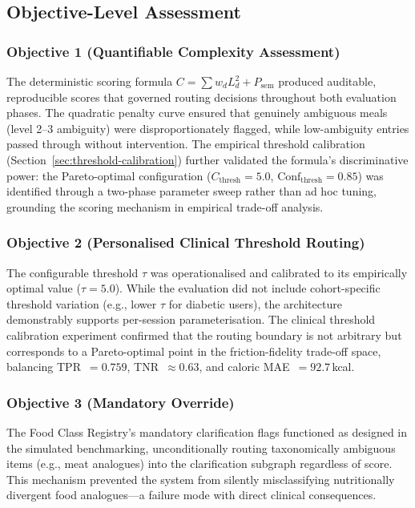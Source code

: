 \subsection{Objective-Level Assessment}

\subsubsection{Objective 1 (Quantifiable Complexity Assessment)}
The deterministic scoring formula $C = \sum w_d L_d^2 + P_{\text{sem}}$ produced auditable, reproducible scores that governed routing decisions throughout both evaluation phases. The quadratic penalty curve ensured that genuinely ambiguous meals (level 2--3 ambiguity) were disproportionately flagged, while low-ambiguity entries passed through without intervention. The empirical threshold calibration (Section~\ref{sec:threshold-calibration}) further validated the formula's discriminative power: the Pareto-optimal configuration ($C_{\text{thresh}}=5.0$, $\text{Conf}_{\text{thresh}}=0.85$) was identified through a two-phase parameter sweep rather than ad hoc tuning, grounding the scoring mechanism in empirical trade-off analysis.

\subsubsection{Objective 2 (Personalised Clinical Threshold Routing)}
The configurable threshold $\tau$ was operationalised and calibrated to its empirically optimal value ($\tau=5.0$). While the evaluation did not include cohort-specific threshold variation (e.g., lower $\tau$ for diabetic users), the architecture demonstrably supports per-session parameterisation. The clinical threshold calibration experiment confirmed that the routing boundary is not arbitrary but corresponds to a Pareto-optimal point in the friction-fidelity trade-off space, balancing TPR~$= 0.759$, TNR~$\approx 0.63$, and caloric MAE~$= 92.7\,$kcal.

\subsubsection{Objective 3 (Mandatory Override)}
The Food Class Registry's mandatory clarification flags functioned as designed in the simulated benchmarking, unconditionally routing taxonomically ambiguous items (e.g., meat analogues) into the clarification subgraph regardless of score. This mechanism prevented the system from silently misclassifying nutritionally divergent food analogues---a failure mode with direct clinical consequences.

